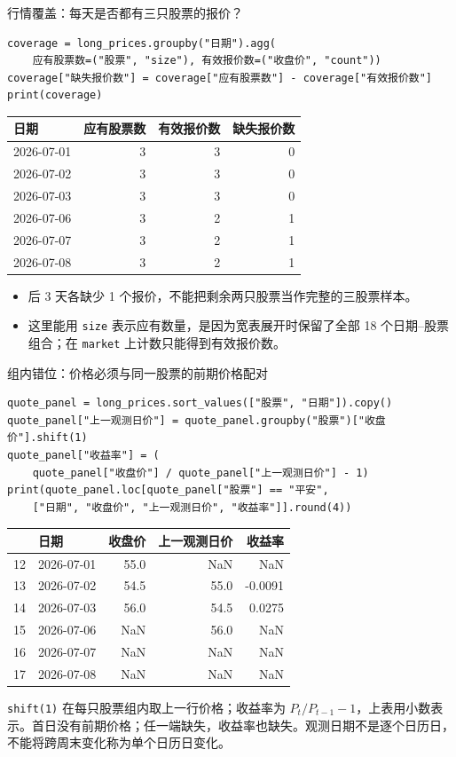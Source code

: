 \documentclass[9pt]{ctexbeamer}
\begin{document}
\begin{frame}[fragile]{行情覆盖：每天是否都有三只股票的报价？}
\begin{lstlisting}[basicstyle=\ttfamily\scriptsize]
coverage = long_prices.groupby("日期").agg(
    应有股票数=("股票", "size"), 有效报价数=("收盘价", "count"))
coverage["缺失报价数"] = coverage["应有股票数"] - coverage["有效报价数"]
print(coverage)
\end{lstlisting}
\begin{center}
\small
\begin{tabular}{lrrr}
\toprule
日期 & 应有股票数 & 有效报价数 & 缺失报价数 \\
\midrule
2026-07-01 & 3 & 3 & 0 \\
2026-07-02 & 3 & 3 & 0 \\
2026-07-03 & 3 & 3 & 0 \\
2026-07-06 & 3 & 2 & 1 \\
2026-07-07 & 3 & 2 & 1 \\
2026-07-08 & 3 & 2 & 1 \\
\bottomrule
\end{tabular}
\end{center}
\begin{itemize}
\item 后 3 天各缺少 1 个报价，不能把剩余两只股票当作完整的三股票样本。
\item 这里能用 \texttt{size} 表示应有数量，是因为宽表展开时保留了全部 18 个日期--股票组合；在 \texttt{market} 上计数只能得到有效报价数。
\end{itemize}
\end{frame}

\begin{frame}[fragile]{组内错位：价格必须与同一股票的前期价格配对}
\begin{lstlisting}[basicstyle=\ttfamily\scriptsize]
quote_panel = long_prices.sort_values(["股票", "日期"]).copy()
quote_panel["上一观测日价"] = quote_panel.groupby("股票")["收盘价"].shift(1)
quote_panel["收益率"] = (
    quote_panel["收盘价"] / quote_panel["上一观测日价"] - 1)
print(quote_panel.loc[quote_panel["股票"] == "平安",
    ["日期", "收盘价", "上一观测日价", "收益率"]].round(4))
\end{lstlisting}
\begin{center}
\small
\begin{tabular}{rlrrr}
\toprule
 & 日期 & 收盘价 & 上一观测日价 & 收益率 \\
\midrule
12 & 2026-07-01 & 55.0 & NaN & NaN \\
13 & 2026-07-02 & 54.5 & 55.0 & -0.0091 \\
14 & 2026-07-03 & 56.0 & 54.5 & 0.0275 \\
15 & 2026-07-06 & NaN & 56.0 & NaN \\
16 & 2026-07-07 & NaN & NaN & NaN \\
17 & 2026-07-08 & NaN & NaN & NaN \\
\bottomrule
\end{tabular}
\end{center}
\small \texttt{shift(1)} 在每只股票组内取上一行价格；收益率为 $P_t/P_{t-1}-1$，上表用小数表示。首日没有前期价格；任一端缺失，收益率也缺失。观测日期不是逐个日历日，不能将跨周末变化称为单个日历日变化。
\end{frame}
\end{document}
